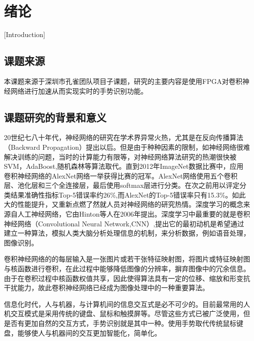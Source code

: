 
\chapter{绪论}[Introduction]

\section{课题来源}
本课题来源于深圳市孔雀团队项目子课题，研究的主要内容是使用FPGA对卷积神经网络进行加速从而实现实时的手势识别功能。

\section{课题研究的背景和意义}%
20世纪七八十年代，神经网络\cite{psaltis1988multilayered}的研究在学术界异常火热，尤其是在反向传播算法\cite{rumelhart1986learning}（Backward Propagation）提出以后。但是由于种种因素的限制，如神经网络很难解决训练的问题，当时的计算能力有限等，对神经网络算法研究的热潮很快被SVM，AdaBoost,随机森林等算法取代。直到2012年ImageNet数据比赛中，应用卷积神经网络的AlexNet网络\cite{krizhevsky2012imagenet}一举获得比赛的冠军。AlexNet网络使用五个卷积层、池化层和三个全连接层，最后使用softmax层进行分类。在次之前用以评定分类结果准确性指标Top-5错误率约26\%,而AlexNet的Top-5错误率只有15.3\%。如此大的性能提升，又重新点燃了然就人员对神经网络的研究热情。深度学习的概念来源自人工神经网络，它由Hinton\cite{hinton2006reducing}等人在2006年提出。深度学习中最重要的就是卷积神经网络\cite{bouvrie2006notes}（Convolutional Neural Network,CNN）,提出它的最初动机是希望通过建立一种算法，模拟人类大脑分析处理信息的机制，来分析数据，例如语音处理\cite{mikolov2013efficient}，图像识别\cite{kavukcuoglu2010learning}。

卷积神经网络的的每层输入是一张图片或若干张特征映射图，将图片或特征映射图与核函数进行卷积，在此过程中能够降低图像的分辨率，摒弃图像中的冗余信息。由于在卷积过程中核函数权值共享，因此使得算法具有一定的位移、缩放和形变抗干扰能力\cite{fukushima1983neocognitron}，故此卷积神经网络已经成为图像处理中的一种重要算法。

信息化时代，人与机器，与计算机间的信息交互式是必不可少的。目前最常用的人机交互模式是采用传统的键盘、鼠标和触摸屏等。尽管这些方式已被广泛使用，但是否有更加自然的交互方式，手势识别就是其中一种。使用手势取代传统鼠标键盘，能够使人与机器间的交互更加智能化，简单化。

